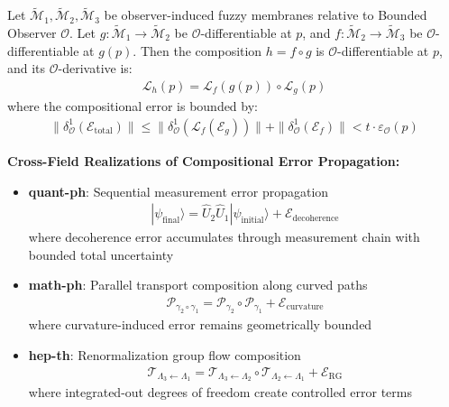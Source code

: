 \begin{theorem}
\label{theorem:bk4_fuzzy_chain_rule}
Let $\tilde{\mathcal{M}}_1, \tilde{\mathcal{M}}_2, \tilde{\mathcal{M}}_3$ be observer-induced fuzzy membranes relative to Bounded Observer $\mathcal{O}$. Let $g: \tilde{\mathcal{M}}_1 \rightarrow \tilde{\mathcal{M}}_2$ be $\mathcal{O}$-differentiable at $p$, and $f: \tilde{\mathcal{M}}_2 \rightarrow \tilde{\mathcal{M}}_3$ be $\mathcal{O}$-differentiable at $g(p)$. Then the composition $h = f \circ g$ is $\mathcal{O}$-differentiable at $p$, and its $\mathcal{O}$-derivative is:
\begin{align}
\mathcal{L}_h(p) = \mathcal{L}_f(g(p)) \circ \mathcal{L}_g(p)
\end{align}
where the compositional error is bounded by:
\begin{align}
\|\delta^1_{\mathcal{O}}(\mathcal{E}_{\text{total}})\| \leq \|\delta^1_{\mathcal{O}}(\mathcal{L}_f(\mathcal{E}_g))\| + \|\delta^1_{\mathcal{O}}(\mathcal{E}_f)\| < t \cdot \varepsilon_{\mathcal{O}}(p)
\end{align}

\textbf{Cross-Field Realizations of Compositional Error Propagation:}

\begin{itemize}
\item \textbf{quant-ph}: Sequential measurement error propagation
  \begin{align}
  |\psi_{\text{final}}\rangle = \hat{U}_2 \hat{U}_1 |\psi_{\text{initial}}\rangle + \mathcal{E}_{\text{decoherence}}
  \end{align}
  where decoherence error accumulates through measurement chain with bounded total uncertainty
  
\item \textbf{math-ph}: Parallel transport composition along curved paths
  \begin{align}
  \mathcal{P}_{\gamma_2 \circ \gamma_1} = \mathcal{P}_{\gamma_2} \circ \mathcal{P}_{\gamma_1} + \mathcal{E}_{\text{curvature}}
  \end{align}
  where curvature-induced error remains geometrically bounded
  
\item \textbf{hep-th}: Renormalization group flow composition
  \begin{align}
  \mathcal{T}_{\Lambda_3 \leftarrow \Lambda_1} = \mathcal{T}_{\Lambda_3 \leftarrow \Lambda_2} \circ \mathcal{T}_{\Lambda_2 \leftarrow \Lambda_1} + \mathcal{E}_{\text{RG}}
  \end{align}
  where integrated-out degrees of freedom create controlled error terms
  

\end{itemize}
\end{theorem}

